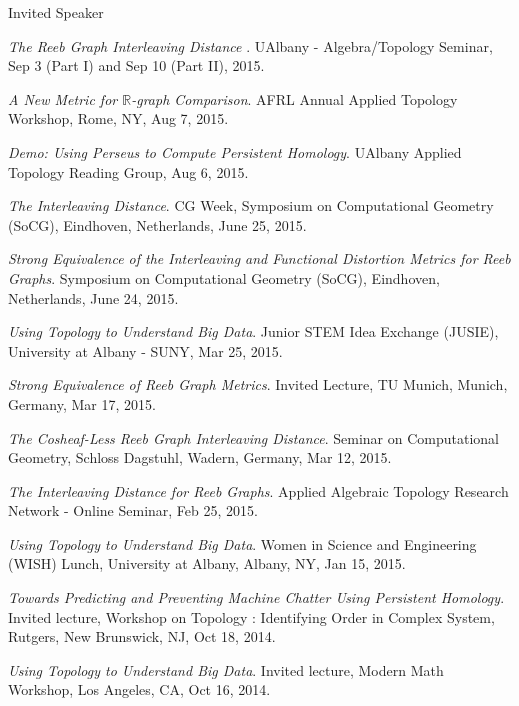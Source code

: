 \documentclass{resume} %
\begin{document}
\begin{rSection}{Invited Speaker}
\begin{etaremune}
\item\emph{The Reeb Graph Interleaving Distance }. UAlbany - Algebra/Topology Seminar, Sep 3 (Part I) and Sep 10 (Part II), 2015. 

\item\emph{A New Metric for $\mathbb{R}$-graph Comparison}. AFRL Annual Applied Topology Workshop, Rome, NY, Aug 7, 2015. 

\item\emph{Demo: Using Perseus to Compute Persistent Homology}. UAlbany Applied Topology Reading Group, Aug 6, 2015. 

\item\emph{The Interleaving Distance}. CG Week, Symposium on Computational Geometry (SoCG), Eindhoven, Netherlands, June 25, 2015. 

\item\emph{Strong Equivalence of the Interleaving and Functional Distortion Metrics for Reeb Graphs}. Symposium on Computational Geometry (SoCG), Eindhoven, Netherlands, June 24, 2015. 

\item\emph{Using Topology to Understand Big Data}. Junior STEM Idea Exchange (JUSIE), University at Albany - SUNY, Mar 25, 2015. 

\item\emph{Strong Equivalence of Reeb Graph Metrics}. Invited Lecture, TU Munich, Munich, Germany, Mar 17, 2015. 

\item\emph{The Cosheaf-Less Reeb Graph Interleaving Distance}. Seminar on Computational Geometry, Schloss Dagstuhl, Wadern, Germany, Mar 12, 2015. 

\item\emph{The Interleaving Distance for Reeb Graphs}. Applied Algebraic Topology Research Network - Online Seminar, Feb 25, 2015. 

\item\emph{Using Topology to Understand Big Data}. Women in Science and Engineering (WISH) Lunch, University at Albany, Albany, NY, Jan 15, 2015. 

\item\emph{Towards Predicting and Preventing Machine Chatter Using Persistent Homology}. Invited lecture, Workshop on Topology : Identifying Order in Complex System, Rutgers, New Brunswick, NJ, Oct 18, 2014. 

\item\emph{Using Topology to Understand Big Data}. Invited lecture, Modern Math Workshop, Los Angeles, CA, Oct 16, 2014. 


\end{etaremune}
\end{rSection}
\end{document}
